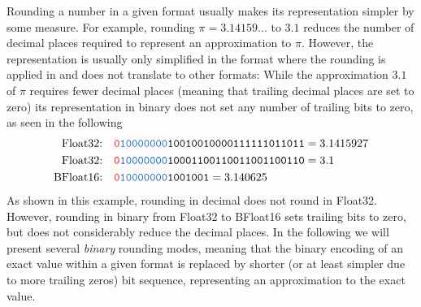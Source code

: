 Rounding a number in a given format usually makes its representation simpler by some measure. For example, rounding $\pi = 3.14159...$
to $3.1$ reduces the number of decimal places required to represent an approximation to $\pi$. However, the representation is usually
only simplified in the format where the rounding is applied in and does not translate to other formats: While the approximation $3.1$ of $\pi$
requires fewer decimal places (meaning that trailing decimal places are set to zero) its representation in binary does not set any number of
trailing bits to zero, as seen in the following
\begin{align}
\text{Float32:}& \quad \mathtt{{\color{psign}0}{\color{pexpo}10000000}10010010000111111011011} = 3.1415927 \nonumber \\
\text{Float32:}& \quad \mathtt{{\color{psign}0}{\color{pexpo}10000000}10001100110011001100110} = 3.1 \nonumber \\
\text{BFloat16:}& \quad \mathtt{{\color{psign}0}{\color{pexpo}10000000}1001001} = 3.140625
\end{align}
As shown in this example, rounding in decimal does not round in Float32. However, rounding in binary from Float32 to
BFloat16 sets trailing bits to zero, but does not considerably reduce the decimal places. In the following we will present
several \emph{binary} rounding modes, meaning that the binary encoding of an exact value within a given format is replaced
by shorter (or at least simpler due to more trailing zeros) bit sequence, representing an approximation to the exact value.

